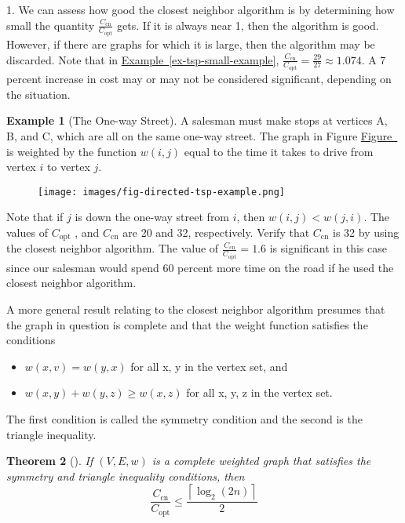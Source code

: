 \documentclass[10pt,]{book}
\theoremstyle{plain}
\newtheorem{theorem}{Theorem}[section]
\theoremstyle{definition}
\theoremstyle{definition}
\theoremstyle{definition}
\newtheorem{example}[theorem]{Example}
\theoremstyle{definition}
\theoremstyle{definition}
\numberwithin{equation}{section}
\begin{document}
1\). We can assess how good the closest neighbor algorithm is by determining how small the quantity \(\frac{C_{\text{cn}}}{C_{\text{opt}}}\) gets.
If it is always near 1, then the algorithm is good. However, if there are graphs for which it is large, then the algorithm may be discarded. Note
that in \hyperref[ex-tsp-small-example]{Example~\ref{ex-tsp-small-example}}, \(\frac{C_{\text{cn}}}{C_{\text{opt}}} = \frac{29}{27}\approx 1.074\). A 7 percent increase in cost may or may not be considered
significant, depending on the situation.%
\begin{example}[The One-way Street]\label{ex-one-way-street}
 A salesman must make stops at vertices A, B, and C, which are all on the same one-way street. The graph in Figure \hyperref[fig-directed-tsp-example]{Figure~} is weighted by the function \(w(i, j)\) equal to the time it takes to drive from vertex \(i\) to vertex \(j\).%
\leavevmode%
\begin{figure}
\centering
\texttt{[image: images/fig-directed-tsp-example.png]}
\end{figure}
\par
Note that if \(j\) is down the one-way street from \(i\), then \(w(i, j) < w(j, i)\). The values of \(C_{\text{opt}}\) , and \(C_{\text{cn}}\)
are 20 and 32, respectively. Verify that \(C_{\text{cn}}\) is 32 by using the closest neighbor algorithm. The value of \(\frac{C_{\text{cn}}}{C_{\text{opt}}} = 1.6\) is significant in this case since our salesman would spend 60 percent more time on the road if he used the closest neighbor algorithm.%
\end{example}
\par
A more general result relating to the closest neighbor algorithm presumes that the graph in question is complete and that the weight function satisfies the conditions%
\par
\leavevmode%
\begin{itemize}[label=\textbullet]
\item{} \(w(x, v) = w(y, x)\) for all  x, y in the vertex set, and %
\item{} \(w(x, y) + w(y, z) \geq  w(x, z)\) for all  x, y, z in the vertex set.%
\end{itemize}
%
\par
The first condition is called the  symmetry condition and the second is the  triangle inequality.%
\begin{theorem}[]\label{th-cn-theorem-9-5}
\index{}If \((V, E, w)\) is a complete weighted graph that satisfies the symmetry and triangle inequality conditions, then
\[\frac{C_{\text{cn}}}{C_{\text{opt}}}\leq \frac{\left\lceil \log _2 (2n)\right\rceil }{2}\]%
\end{theorem}
\end{document}
